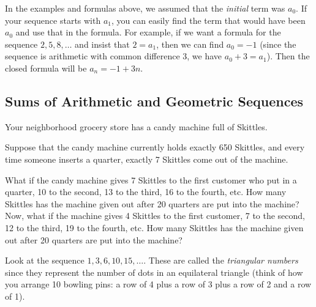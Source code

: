 \documentclass[12pt]{article}
\begin{document}
In the examples and formulas above, we assumed that the \emph{initial} term was $a_0$.  If your sequence starts with $a_1$, you can easily find the term that would have been $a_0$ and use that in the formula.  For example, if we want a formula for the sequence $2, 5, 8,\ldots$ and insist that $2= a_1$, then we can find $a_0 = -1$ (since the sequence is arithmetic with common difference 3, we have $a_0 + 3 = a_1$).  Then the closed formula will be $a_n = -1 + 3n$.



\subsection{Sums of Arithmetic and Geometric Sequences}

\begin{activity}
Your neighborhood grocery store has a candy machine full of Skittles.
\begin{questions}
\question Suppose that the candy machine currently holds exactly 650 Skittles, and every time someone inserts a quarter, exactly 7 Skittles come out of the machine.
\question What if the candy machine gives 7 Skittles to the first customer who put in a quarter, 10 to the second, 13 to the third, 16 to the fourth, etc. How many Skittles has the machine given out after 20 quarters are put into the machine?
\question Now, what if the machine gives 4 Skittles to the first customer, 7 to the second, 12 to the third, 19 to the fourth, etc. How many Skittles has the machine given out after 20 quarters are put into the machine?
\end{questions}
\end{activity}



Look at the sequence $1, 3, 6, 10, 15,\ldots$.  These are called the \emph{triangular numbers} since they represent the number of dots in an equilateral triangle (think of how you arrange 10 bowling pins: a row of 4 plus a row of 3 plus a row of 2 and a row of 1).
\end{document}
